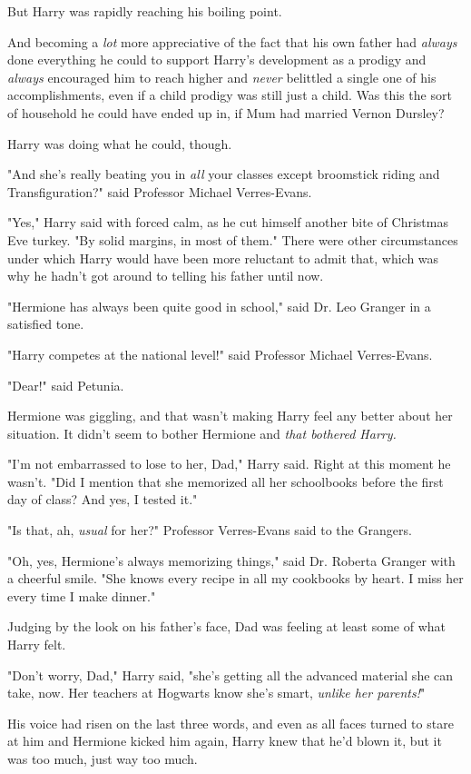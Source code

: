 But Harry was rapidly reaching his boiling point.

And becoming a \emph{lot} more appreciative of the fact that his own father had
\emph{always} done everything he could to support Harry's development as a
prodigy and \emph{always} encouraged him to reach higher and \emph{never}
belittled a single one of his accomplishments, even if a child prodigy was
still just a child. Was this the sort of household he could have ended up in,
if Mum had married Vernon Dursley?

Harry was doing what he could, though.

"And she's really beating you in \emph{all} your classes except broomstick
riding and Transfiguration?" said Professor Michael Verres-Evans.

"Yes," Harry said with forced calm, as he cut himself another bite of Christmas
Eve turkey. "By solid margins, in most of them." There were other circumstances
under which Harry would have been more reluctant to admit that, which was why
he hadn't got around to telling his father until now.

"Hermione has always been quite good in school," said Dr. Leo Granger in a
satisfied tone.

"Harry competes at the national level!" said Professor Michael Verres-Evans.

"Dear!" said Petunia.

Hermione was giggling, and that wasn't making Harry feel any better about her
situation. It didn't seem to bother Hermione and \emph{that bothered Harry.}

"I'm not embarrassed to lose to her, Dad," Harry said. Right at this moment he
wasn't. "Did I mention that she memorized all her schoolbooks before the first
day of class? And yes, I tested it."

"Is that, ah, \emph{usual} for her?" Professor Verres-Evans said to the
Grangers.

"Oh, yes, Hermione's always memorizing things," said Dr. Roberta Granger with a
cheerful smile. "She knows every recipe in all my cookbooks by heart. I miss
her every time I make dinner."

Judging by the look on his father's face, Dad was feeling at least some of what
Harry felt.

"Don't worry, Dad," Harry said, "she's getting all the advanced material she
can take, now. Her teachers at Hogwarts know she's smart, \emph{unlike her
parents!}"

His voice had risen on the last three words, and even as all faces turned to
stare at him and Hermione kicked him again, Harry knew that he'd blown it, but
it was too much, just way too much.


